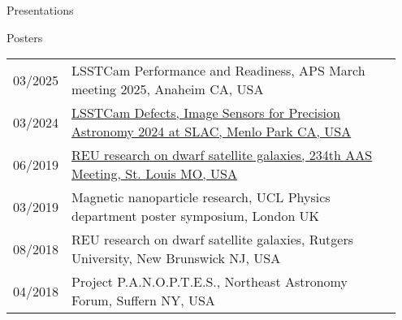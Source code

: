 \documentclass{resume} %
\begin{document}
\begin{rSection}{Presentations}
\begin{rSubsection}{Posters}{}{}{}
\begin{table}[h]
\begin{tabular}{p{0.07\linewidth} p{0.88\linewidth}}
03/2025 & LSSTCam Performance and Readiness, APS March meeting 2025, Anaheim CA, USA\\
03/2024 & \href{https://indico.slac.stanford.edu/event/8442/contributions/8626/}{LSSTCam Defects, Image Sensors for Precision Astronomy 2024 at SLAC, Menlo Park CA, USA}\\
06/2019 & \href{https://assets.pubpub.org/d14kkapv/41575915658488.pdf}{REU research on dwarf satellite galaxies, 234th AAS Meeting, St. Louis MO, USA}\\
03/2019 & Magnetic nanoparticle research, UCL Physics department poster symposium, London UK\\
08/2018 & REU research on dwarf satellite galaxies, Rutgers University, New Brunswick NJ, USA\\
04/2018 & Project P.A.N.O.P.T.E.S., Northeast Astronomy Forum, Suffern NY, USA\\
\end{tabular}
\end{table}
\end{rSubsection}

\end{rSection}
\end{document}
